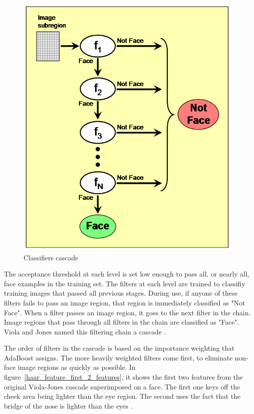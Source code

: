 \begin{figure}[!h]
\begin{center}
\noindent \includegraphics[scale=0.8]{figures/haar_feature_cascade} 
\newline
\caption{Classifiers cascade}
\label{haar_feature_cascade}
\end{center} 
\end{figure}

\noindent The acceptance threshold at each level is set low enough to pass all, or nearly all, face examples in the training set. The filters at each level are trained to classifiy training images that passed all previous stages. During use, if anyone of these filters fails to pass an image region, that region is immediately classified as "Not Face". When a filter passes an image region, it goes to the next filter in the chain. Image regions that pass through all filters in the chain are classified as "Face". Viola and Jones named this filtering chain a cascade \cite{HEW07}.
\newline

\noindent The order of filters in the cascade is based on the importance weighting that AdaBoost assigns. The more heavily weighted filters come first, to eliminate non-face image regions as quickly as possible. In figure~\ref{haar_feature_first_2_features}, it shows the first two features from the original Viola-Jones cascade superimposed on a face. The first one keys off the cheek area being lighter than the eye region. The second uses the fact that the bridge of the nose is lighter than the eyes \cite{HEW07}.
\newline

